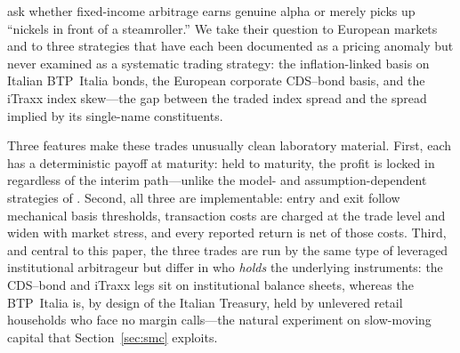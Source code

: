 
\citet{duarte2007risk} ask whether fixed-income arbitrage earns genuine alpha
or merely picks up ``nickels in front of a steamroller.'' We take their
question to European markets and to three strategies that have each been
documented as a pricing anomaly but never examined as a systematic trading
strategy: the inflation-linked basis on Italian BTP~Italia bonds, the European
corporate CDS--bond basis, and the iTraxx index skew---the gap between the
traded index spread and the spread implied by its single-name constituents.

Three features make these trades unusually clean laboratory material. First,
each has a deterministic payoff at maturity: held to maturity, the profit is
locked in regardless of the interim path---unlike the model- and
assumption-dependent strategies of \citet{duarte2007risk}. Second, all three
are implementable: entry and exit follow mechanical basis thresholds,
transaction costs are charged at the trade level and widen with market stress,
and every reported return is net of those costs. Third, and central to this
paper, the three trades are run by the same type of leveraged institutional
arbitrageur but differ in who \emph{holds} the underlying instruments: the
CDS--bond and iTraxx legs sit on institutional balance sheets, whereas the
BTP~Italia is, by design of the Italian Treasury, held by unlevered retail
households who face no margin calls---the natural experiment on slow-moving
capital \citep{duffie2010presidential} that Section~\ref{sec:smc} exploits.

